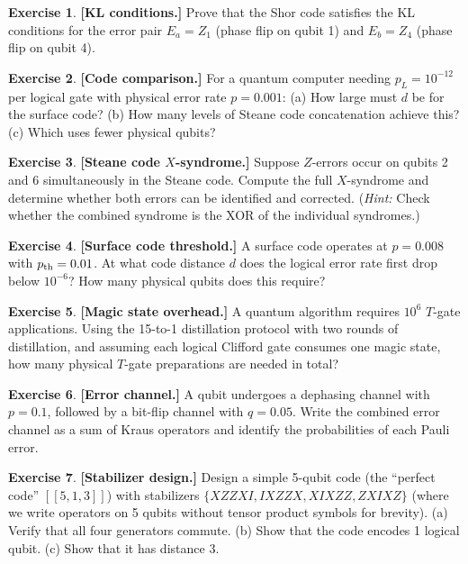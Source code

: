 \documentclass[11pt, a4paper]{article}
\theoremstyle{definition}
\newtheorem{exercise}{Exercise}[section]
\theoremstyle{plain}
\theoremstyle{remark}
\newcommand{\code}[1]{[\![#1]\!]}
\begin{document}
\begin{exercise}
\textbf{[KL conditions.]}
Prove that the Shor code satisfies the KL conditions for the error pair
$E_a = Z_1$ (phase flip on qubit 1) and $E_b = Z_4$ (phase flip on qubit 4).
\end{exercise}

\begin{exercise}
\textbf{[Code comparison.]}
For a quantum computer needing $p_L = 10^{-12}$ per logical gate with
physical error rate $p = 0.001$:
(a) How large must $d$ be for the surface code?
(b) How many levels of Steane code concatenation achieve this?
(c) Which uses fewer physical qubits?
\end{exercise}

\begin{exercise}
\textbf{[Steane code $X$-syndrome.]}
Suppose $Z$-errors occur on qubits 2 and 6 simultaneously in the Steane
code.  Compute the full $X$-syndrome and determine whether both errors
can be identified and corrected.
(\emph{Hint:} Check whether the combined syndrome is the XOR of the
individual syndromes.)
\end{exercise}

\begin{exercise}
\textbf{[Surface code threshold.]}
A surface code operates at $p = 0.008$ with $p_{\rm th} = 0.01$.
At what code distance $d$ does the logical error rate first drop below
$10^{-6}$?  How many physical qubits does this require?
\end{exercise}

\begin{exercise}
\textbf{[Magic state overhead.]}
A quantum algorithm requires $10^6$ $T$-gate applications.  Using the
15-to-1 distillation protocol with two rounds of distillation, and assuming
each logical Clifford gate consumes one magic state, how many physical
$T$-gate preparations are needed in total?
\end{exercise}

\begin{exercise}
\textbf{[Error channel.]}
A qubit undergoes a dephasing channel with $p = 0.1$, followed by a
bit-flip channel with $q = 0.05$.  Write the combined error channel as
a sum of Kraus operators and identify the probabilities of each Pauli error.
\end{exercise}

\begin{exercise}
\textbf{[Stabilizer design.]}
Design a simple 5-qubit code (the ``perfect code'' $\code{5,1,3}$) with
stabilizers $\{XZZXI, IXZZX, XIXZZ, ZXIXZ\}$ (where we write operators
on 5 qubits without tensor product symbols for brevity).
(a) Verify that all four generators commute.
(b) Show that the code encodes 1 logical qubit.
(c) Show that it has distance 3.
\end{exercise}
\end{document}
